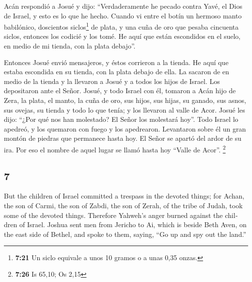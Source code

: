 \begin{paracol}{2}
 Acán respondió a Josué y dijo: ``Verdaderamente he
pecado contra Yavé, el Dios de Israel, y esto es lo que he hecho.
 Cuando vi entre el botín un hermoso manto babilónico,
doscientos siclos\footnote{\textbf{7:21} Un siclo equivale a unos 10
  gramos o a unas 0,35 onzas.} de plata, y una cuña de oro que pesaba
cincuenta siclos, entonces los codicié y los tomé. He aquí que están
escondidos en el suelo, en medio de mi tienda, con la plata debajo''.

 Entonces Josué envió mensajeros, y éstos corrieron a la
tienda. He aquí que estaba escondida en su tienda, con la plata debajo
de ella.  La sacaron de en medio de la tienda y la
llevaron a Josué y a todos los hijos de Israel. Los depositaron ante el
Señor.  Josué, y todo Israel con él, tomaron a Acán hijo
de Zera, la plata, el manto, la cuña de oro, sus hijos, sus hijas, su
ganado, sus asnos, sus ovejas, su tienda y todo lo que tenía; y los
llevaron al valle de Acor.  Josué les dijo: ``¿Por qué
nos han molestado? El Señor los molestará hoy''. Todo Israel lo apedreó,
y los quemaron con fuego y los apedrearon.  Levantaron
sobre él un gran montón de piedras que permanece hasta hoy. El Señor se
apartó del ardor de su ira. Por eso el nombre de aquel lugar se llamó
hasta hoy ``Valle de Acor''. \footnote{\textbf{7:26} Is 65,10; Os 2,15}

\switchcolumn
\begin{otherlanguage}{english}

\hypertarget{section-13}{%
\section{7}\label{section-13}}

 But the children of Israel committed a trespass in the
devoted things; for Achan, the son of Carmi, the son of Zabdi, the son
of Zerah, of the tribe of Judah, took some of the devoted things.
Therefore Yahweh's anger burned against the children of Israel.
 Joshua sent men from Jericho to Ai, which is beside Beth
Aven, on the east side of Bethel, and spoke to them, saying, ``Go up and
spy out the land.''


\end{otherlanguage}
\end{paracol}
